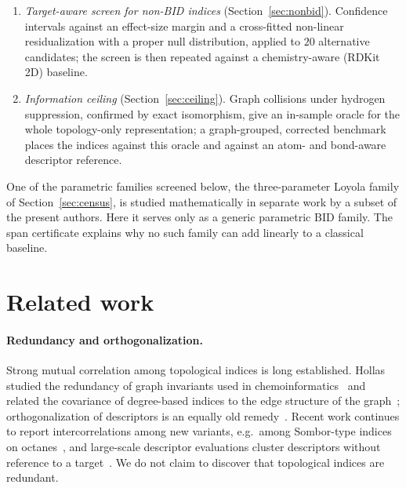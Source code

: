 \documentclass[11pt,a4paper]{article}
\theoremstyle{definition}
\begin{document}
\begin{enumerate}[label=(\arabic*)]
numerically safe recipe and a one-function implementation of the
certificate that returns each index's coefficient vector.
\item \emph{Target-aware screen for non-BID indices}
(Section~\ref{sec:nonbid}). Confidence intervals against an
effect-size margin and a cross-fitted non-linear residualization with
a proper null distribution, applied to $20$ alternative candidates;
the screen is then repeated against a chemistry-aware (RDKit 2D)
baseline.
\item \emph{Information ceiling} (Section~\ref{sec:ceiling}). Graph
collisions under hydrogen suppression, confirmed by exact isomorphism,
give an in-sample oracle for the whole topology-only representation; a
graph-grouped, corrected benchmark places the indices against this
oracle and against an atom- and bond-aware descriptor reference.
\end{enumerate}

One of the parametric families screened below, the three-parameter
Loyola family of Section~\ref{sec:census}, is studied mathematically in
separate work by a subset of the present authors. Here it serves only
as a generic parametric BID family. The span certificate explains why
no such family can add linearly to a classical baseline.

\section{Related work}\label{sec:related}

\paragraph{Redundancy and orthogonalization.} Strong mutual
correlation among topological indices is long established. Hollas
studied the redundancy of graph invariants used in
chemoinformatics~\cite{Hollas2006Redundancy} and related the
covariance of degree-based indices to the edge structure of the
graph~\cite{Hollas2005Covariance}; orthogonalization of descriptors is
an equally old remedy~\cite{Lucic1997Orthogonal,Du2002Orthogonal}.
Recent work continues to report intercorrelations among new
variants, e.g.\ among Sombor-type indices on octanes~\cite{MovahediGutmanRedzepovicFurtula2026,Redzepovic2021ChemSombor},
and large-scale descriptor evaluations cluster descriptors without
reference to a target~\cite{DehmerEmmertStreibTripathi2013,Ma2022Usefulness}.
We do not claim to discover that topological indices are redundant.
\end{document}
